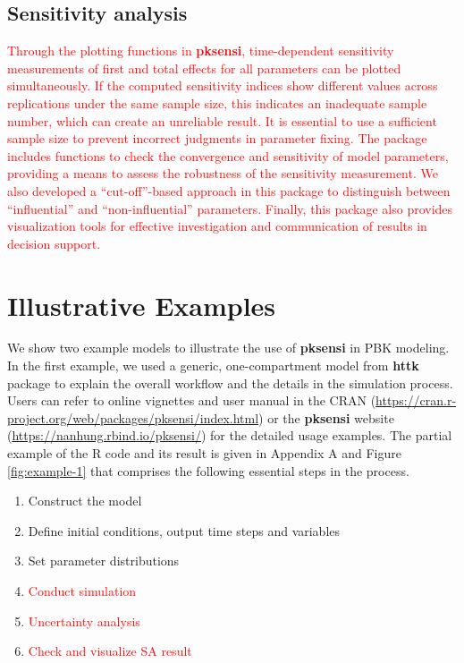 \documentclass[preprint,12pt, a4paper]{elsarticle}
\begin{document}
\subsection{Sensitivity analysis}

\textcolor{red}{Through the plotting functions in \textbf{pksensi}, time-dependent sensitivity measurements of first and total effects for all parameters can be plotted simultaneously. If the computed sensitivity indices show different values across replications under the same sample size, this indicates an inadequate sample number, which can create an unreliable result. It is essential to use a sufficient sample size to prevent incorrect judgments in parameter fixing. The package includes functions to check the convergence and sensitivity of model parameters, providing a means to assess the robustness of the sensitivity measurement. We also developed a ``cut-off''-based approach in this package to distinguish between ``influential'' and ``non-influential'' parameters. Finally, this package also provides visualization tools for effective investigation and communication of results in decision support.}


\section{Illustrative Examples}

We show two example models to illustrate the use of \textbf{pksensi} in PBK modeling. In the first example, we used a generic, one-compartment model from \textbf{httk} package \cite{JSSv079i04} to explain the overall workflow and the details in the simulation process. Users can refer to online vignettes and user manual in the CRAN (\url{https://cran.r-project.org/web/packages/pksensi/index.html}) or the \textbf{pksensi} website (\url{https://nanhung.rbind.io/pksensi/}) for the detailed usage examples. The partial example of the R code and its result is given in Appendix A and Figure \ref{fig:example-1} that comprises the following essential steps in the process.

\begin{enumerate}
  \item Construct the model
  \item Define initial conditions, output time steps and variables
  \item Set parameter distributions
  \item \textcolor{red}{Conduct simulation}
  \item \textcolor{red}{Uncertainty analysis}
  \item \textcolor{red}{Check and visualize SA result}
\end{enumerate}
\end{document}
